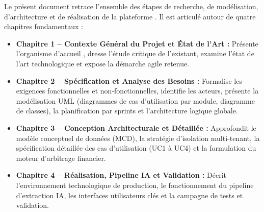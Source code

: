 Le présent document retrace l'ensemble des étapes de recherche, de modélisation, d'architecture et de réalisation de la plateforme \projectShortTitle. Il est articulé autour de quatre chapitres fondamentaux :
\begin{itemize}
    \item \textbf{Chapitre 1 -- Contexte Général du Projet et État de l'Art :} Présente l'organisme d'accueil \hostCompany, dresse l'étude critique de l'existant, examine l'état de l'art technologique et expose la démarche agile retenue.
    \item \textbf{Chapitre 2 -- Spécification et Analyse des Besoins :} Formalise les exigences fonctionnelles et non-fonctionnelles, identifie les acteurs, présente la modélisation UML (diagrammes de cas d'utilisation par module, diagramme de classes), la planification par sprints et l'architecture logique globale.
    \item \textbf{Chapitre 3 -- Conception Architecturale et Détaillée :} Approfondit le modèle conceptuel de données (MCD), la stratégie d'isolation multi-tenant, la spécification détaillée des cas d'utilisation (UC1 à UC4) et la formulation du moteur d'arbitrage financier.
    \item \textbf{Chapitre 4 -- Réalisation, Pipeline IA et Validation :} Décrit l'environnement technologique de production, le fonctionnement du pipeline d'extraction IA, les interfaces utilisateurs clés et la campagne de tests et validation.
\end{itemize}
